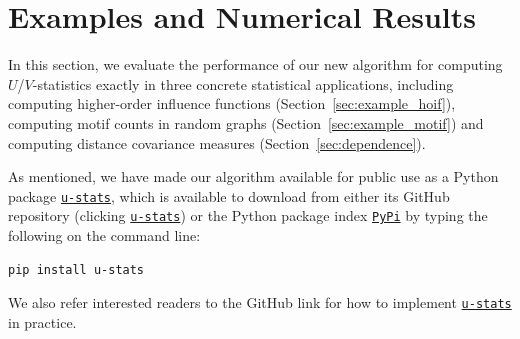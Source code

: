 \documentclass[twoside,11pt]{article}
\def\Einsum{\textsc{Einsum}}
\newcommand{\libref}[2]{\href{#2}{\texttt{#1}}}
\newcommand{\graphset}{\mathcal{G}}
\newcommand{\graphform}[1]{G_{#1}}
\def\calA{\mathcal{A}}
\def\package{\libref{u-stats}{https://github.com/zrq1706/U-Statistics-python}}
\newcommand{\opteinsum}{\libref{opt-einsum}{https://dgasmith.github.io/opt_einsum/}}
\begin{document}


\section{Examples and Numerical Results}  
\label{sec:examples}

In this section, we evaluate the performance of our new algorithm for computing $U$/$V$-statistics exactly in three concrete statistical applications, including computing higher-order influence functions (Section~\ref{sec:example_hoif}), computing motif counts in random graphs (Section~\ref{sec:example_motif}) and computing distance covariance measures (Section~\ref{sec:dependence}). %

As mentioned, we have made our algorithm available for public use as a Python package \package{}, which is available to download from either its GitHub repository (clicking \package{}) or the Python package index \href{https://pypi.org/}{\texttt{PyPi}} by typing the following on the command line:
\begin{lstlisting}[language=bash]
pip install u-stats
\end{lstlisting}
\noindent We also refer interested readers to the GitHub link for how to implement \package{} in practice.
\end{document}
